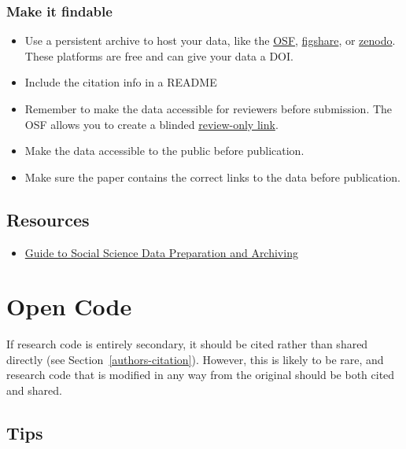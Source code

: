 \documentclass[
  oneside]{book}
\providecommand{\tightlist}{%
  \setlength{\itemsep}{0pt}\setlength{\parskip}{0pt}}
\begin{document}
\hypertarget{make-it-findable}{%
\subsection{Make it findable}\label{make-it-findable}}

\begin{itemize}
\tightlist
\item
  Use a persistent archive to host your data, like the \href{https://osf.io}{OSF}, \href{https://figshare.com/}{figshare}, or \href{https://zenodo.org/}{zenodo}. These platforms are free and can give your data a DOI.
\item
  Include the citation info in a README
\item
  Remember to make the data accessible for reviewers before submission. The OSF allows you to create a blinded \href{https://help.osf.io/hc/en-us/articles/360019930333-Create-a-View-only-Link-for-a-Project}{review-only link}.
\item
  Make the data accessible to the public before publication.
\item
  Make sure the paper contains the correct links to the data before publication.
\end{itemize}

\hypertarget{resources-9}{%
\section{Resources}\label{resources-9}}

\begin{itemize}
\tightlist
\item
  \href{https://www.icpsr.umich.edu/web/pages/deposit/guide/index.html}{Guide to Social Science Data Preparation and Archiving}
\end{itemize}

\hypertarget{authors-open-code}{%
\chapter{Open Code}\label{authors-open-code}}

If research code is entirely secondary, it should be cited rather than shared directly (see Section~\ref{authors-citation}). However, this is likely to be rare, and research code that is modified in any way from the original should be both cited and shared.

\hypertarget{authors-code-tips}{%
\section{Tips}\label{authors-code-tips}}
\end{document}
